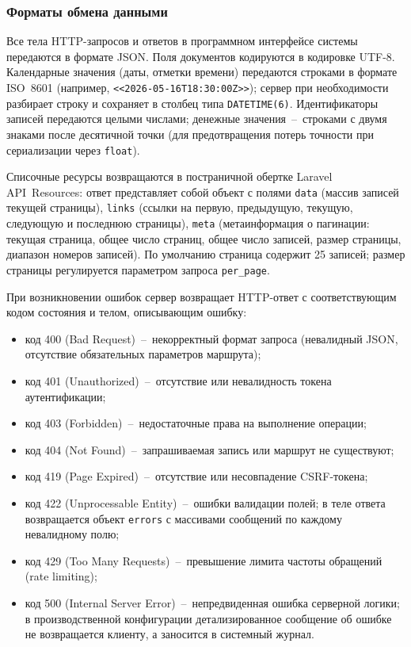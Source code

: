 \subsubsection{Форматы обмена данными}

Все тела HTTP-запросов и ответов в программном интерфейсе системы передаются в формате JSON. Поля документов кодируются в кодировке UTF-8. Календарные значения (даты, отметки времени) передаются строками в формате ISO~8601 (например, \texttt{<<2026-05-16T18:30:00Z>>}); сервер при необходимости разбирает строку и сохраняет в столбец типа \texttt{DATETIME(6)}. Идентификаторы записей передаются целыми числами; денежные значения~--~строками с двумя знаками после десятичной точки (для предотвращения потерь точности при сериализации через \texttt{float}).

Списочные ресурсы возвращаются в постраничной обертке Laravel API~Resources: ответ представляет собой объект с полями \texttt{data} (массив записей текущей страницы), \texttt{links} (ссылки на первую, предыдущую, текущую, следующую и последнюю страницы), \texttt{meta} (метаинформация о пагинации: текущая страница, общее число страниц, общее число записей, размер страницы, диапазон номеров записей). По умолчанию страница содержит 25 записей; размер страницы регулируется параметром запроса \texttt{per\_page}.

При возникновении ошибок сервер возвращает HTTP-ответ с соответствующим кодом состояния и телом, описывающим ошибку:
\begin{itemize}
\item код 400 (Bad Request)~--~некорректный формат запроса (невалидный JSON, отсутствие обязательных параметров маршрута);
\item код 401 (Unauthorized)~--~отсутствие или невалидность токена аутентификации;
\item код 403 (Forbidden)~--~недостаточные права на выполнение операции;
\item код 404 (Not Found)~--~запрашиваемая запись или маршрут не существуют;
\item код 419 (Page Expired)~--~отсутствие или несовпадение CSRF-токена;
\item код 422 (Unprocessable Entity)~--~ошибки валидации полей; в теле ответа возвращается объект \texttt{errors} с массивами сообщений по каждому невалидному полю;
\item код 429 (Too Many Requests)~--~превышение лимита частоты обращений (rate limiting);
\item код 500 (Internal Server Error)~--~непредвиденная ошибка серверной логики; в производственной конфигурации детализированное сообщение об ошибке не возвращается клиенту, а заносится в системный журнал.
\end{itemize}

